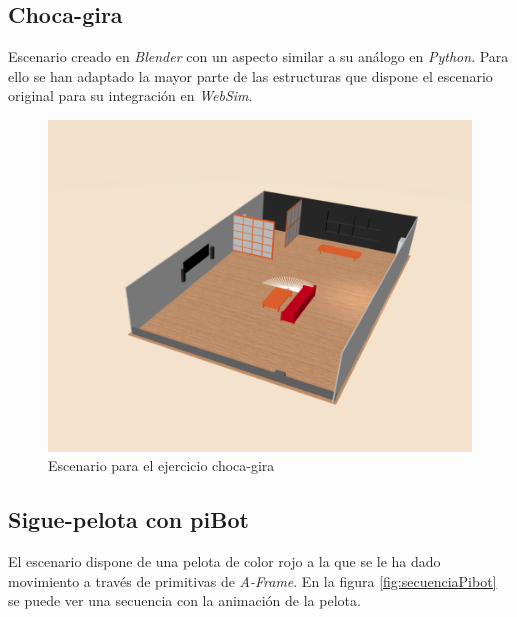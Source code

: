 \subsection{Choca-gira}
\label{subsec:chocagira}
Escenario creado en \textit{Blender} con un aspecto similar a su análogo en \textit{Python}. Para ello se han adaptado la mayor parte de las estructuras que dispone el escenario original para su integración en \textit{WebSim}. 

    \begin{figure}[H]
    \centering
    \includegraphics[scale=0.4]{img/bump&go.png}
    \caption{Escenario para el ejercicio choca-gira} \label{fig:chocagira}
    \end{figure}


\subsection{Sigue-pelota con piBot}
\label{subsec:pelotapibot}
El escenario dispone de una pelota de color rojo a la que se le ha dado movimiento a través de primitivas de \textit{A-Frame}. En la figura \ref{fig:secuenciaPibot} se puede ver una secuencia con la animación de la pelota. 

